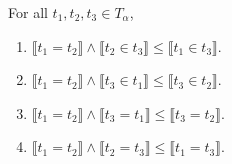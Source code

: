 For all $t_1, t_2, t_3 \in T_{\alpha}$,
\begin{enumerate}
\item $\llbracket t_1 = t_2 \rrbracket \wedge \llbracket t_2 \in t_3 \rrbracket \leq \llbracket t_1 \in t_3 \rrbracket$.
\item $\llbracket t_1 = t_2 \rrbracket \wedge \llbracket t_3 \in t_1 \rrbracket \leq \llbracket t_3 \in t_2 \rrbracket$.
\item $\llbracket t_1 = t_2 \rrbracket \wedge \llbracket t_3 = t_1 \rrbracket \leq \llbracket t_3 = t_2 \rrbracket$.
\item $\llbracket t_1 = t_2 \rrbracket \wedge \llbracket t_2 = t_3 \rrbracket \leq \llbracket t_1 = t_3 \rrbracket$.
\end{enumerate}
